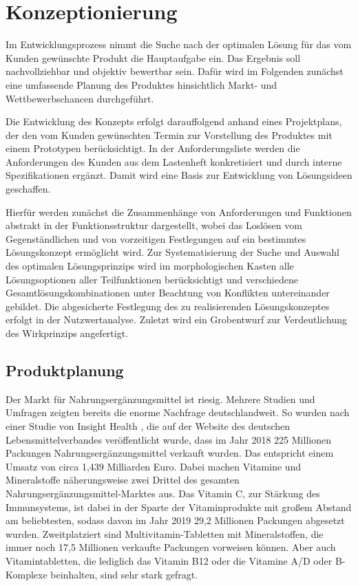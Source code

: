 
\chapter{Konzeptionierung}

Im Entwicklungsprozess nimmt die Suche nach der optimalen Lösung für das vom Kunden gewünschte Produkt die Hauptaufgabe ein. Das Ergebnis soll nachvollziehbar und objektiv bewertbar sein. Dafür wird im Folgenden zunächst eine umfassende Planung des Produktes hinsichtlich Markt- und Wettbewerbschancen durchgeführt.

Die Entwicklung des Konzepts erfolgt darauffolgend anhand eines Projektplans, der den vom Kunden gewünschten Termin zur Vorstellung des Produktes mit einem Prototypen berücksichtigt. In der Anforderungsliste werden die Anforderungen des Kunden aus dem Lastenheft konkretisiert und durch interne Spezifikationen ergänzt. Damit wird eine Basis zur Entwicklung von Lösungsideen geschaffen.

Hierfür werden zunächst die Zusammenhänge von Anforderungen und Funktionen abstrakt in der Funktionsstruktur dargestellt, wobei das Loslösen vom Gegenständlichen und von vorzeitigen Festlegungen auf ein bestimmtes Lösungskonzept ermöglicht wird. Zur Systematisierung der Suche und Auswahl des optimalen Lösungsprinzips wird im morphologischen Kasten alle Lösungsoptionen aller Teilfunktionen berücksichtigt und verschiedene Gesamtlösungskombinationen unter Beachtung von Konflikten untereinander gebildet. Die abgesicherte Festlegung des zu realisierenden Lösungskonzeptes erfolgt in der Nutzwertanalyse. Zuletzt wird ein Grobentwurf zur Verdeutlichung des Wirkprinzips angefertigt.

\section{Produktplanung}
Der Markt für Nahrungsergänzungsmittel ist riesig. Mehrere Studien und Umfragen zeigten bereits die enorme Nachfrage deutschlandweit. So wurden nach einer Studie von Insight Health \cite{studie1}, die auf der Website des deutschen Lebensmittelverbandes veröffentlicht wurde, dass im Jahr 2018 225 Millionen Packungen Nahrungsergänzungsmittel verkauft wurden. Das entspricht einem Umsatz von circa 1,439 Milliarden Euro. Dabei machen Vitamine und Mineralstoffe näherungsweise zwei Drittel des gesamten Nahrungsergänzungsmittel-Marktes aus. Das Vitamin C, zur Stärkung des Immunsystems, ist dabei in der Sparte der Vitaminprodukte mit großem Abstand am beliebtesten, sodass davon im Jahr 2019 29,2 Millionen Packungen abgesetzt wurden. Zweitplatziert sind Multivitamin-Tabletten mit Mineralstoffen, die immer noch 17,5 Millionen verkaufte Packungen vorweisen können. Aber auch Vitamintabletten, die lediglich das Vitamin B12 oder die Vitamine A/D oder B-Komplexe beinhalten, sind sehr stark gefragt.

